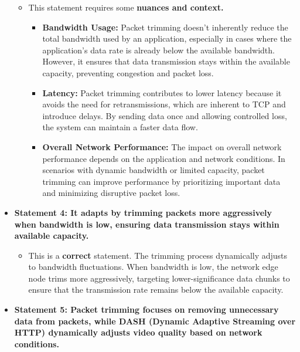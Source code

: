 \documentclass[
]{article}
\begin{document}
\begin{itemize}
  \begin{itemize}
  
  \item
    This statement requires some \textbf{nuances and context.}

    \begin{itemize}
    
    \item
      \textbf{Bandwidth Usage:} Packet trimming doesn't inherently
      reduce the total bandwidth used by an application, especially in
      cases where the application's data rate is already below the
      available bandwidth. However, it ensures that data transmission
      stays within the available capacity, preventing congestion and
      packet loss.
    \item
      \textbf{Latency:} Packet trimming contributes to lower latency
      because it avoids the need for retransmissions, which are inherent
      to TCP and introduce delays. By sending data once and allowing
      controlled loss, the system can maintain a faster data flow.
    \item
      \textbf{Overall Network Performance:} The impact on overall
      network performance depends on the application and network
      conditions. In scenarios with dynamic bandwidth or limited
      capacity, packet trimming can improve performance by prioritizing
      important data and minimizing disruptive packet loss.
    \end{itemize}
  \end{itemize}
\item
  \textbf{Statement 4: It adapts by trimming packets more aggressively
  when bandwidth is low, ensuring data transmission stays within
  available capacity.}

  \begin{itemize}
  
  \item
    This is a \textbf{correct} statement. The trimming process
    dynamically adjusts to bandwidth fluctuations. When bandwidth is
    low, the network edge node trims more aggressively, targeting
    lower-significance data chunks to ensure that the transmission rate
    remains below the available capacity.
  \end{itemize}
\item
  \textbf{Statement 5: Packet trimming focuses on removing unnecessary
  data from packets, while DASH (Dynamic Adaptive Streaming over HTTP)
  dynamically adjusts video quality based on network conditions.}


\end{itemize}
\end{document}
